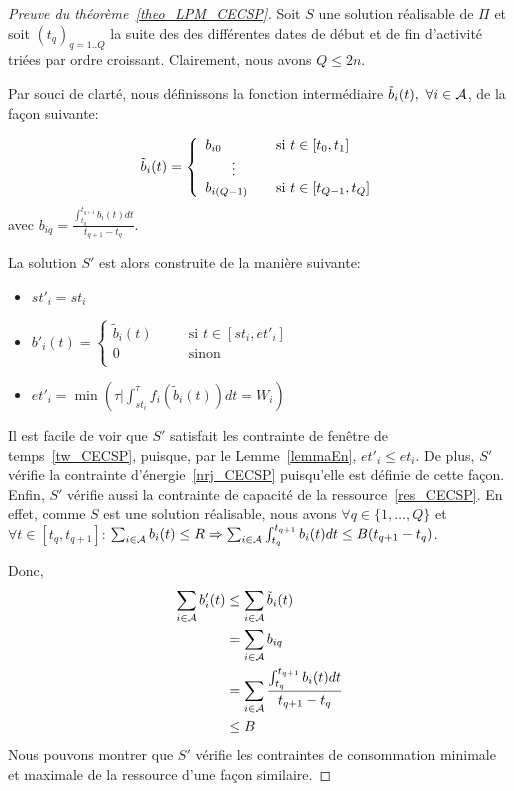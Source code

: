 \begin{proof}[Preuve du théorème~\ref{theo_LPM_CECSP}]  
  Soit $S$ une solution réalisable de $\Pi$ et soit
  $(t_q)_{q=1..Q}$ la suite des des différentes dates de
  début et de fin d'activité triées par ordre croissant. Clairement,
  nous avons $Q\le 2n$. 

  Par souci de clarté, nous définissons la fonction intermédiaire
  $\tilde{b}_i(t),\ \forall i \in {\cal A}$, de la façon suivante:  

    \[\tilde{b}_i(t) =\left\{
        \begin{array}{lll}
          b_{i0} & & \text{si $t \in [t_0,t_1]$}\\
          \multicolumn{2}{c}{\vdots} &   \\
          b_{i(Q-1)} & & \text{si $t \in [t_{Q-1},t_Q]$}
        \end{array}
      \right.\]
    avec $b_{iq}=\frac{\int_{t_q}^{t_{q+1}} b_i(t) dt}{t_{q+1}-t_q}$.

    La solution $S'$ est alors construite de la manière suivante: 
    \begin{itemize}
    \item $st'_i=st_i$ 
    \item $b'_i(t)= \left\{ 
        \begin{array}{lll}
          \tilde{b}_i(t) &\quad& \text{si $t \in [st_i,et'_i]$}\\
          0 &\quad& \text{sinon}\\
        \end{array}
      \right.$
  \item $et'_i=\min(\tau | \int_{st_i}^{\tau} f_i(\tilde{b}_i(t))dt=W_i)$
  \end{itemize}

  Il est facile de voir que $S'$ satisfait les contrainte de fenêtre de
  temps~\eqref{tw_CECSP}, puisque, par le Lemme~\ref{lemmaEn},
  $et'_i\le et_i$. De plus, $S'$ vérifie la contrainte 
  d'énergie~\eqref{nrj_CECSP} puisqu'elle est définie de cette
  façon. Enfin, $S'$ vérifie aussi la contrainte de capacité de la
  ressource~\eqref{res_CECSP}. En effet, comme $S$ est une solution
  réalisable, nous avons $\forall q \in \{1,\dots,Q\}$ et $\forall t
  \in [t_q,t_{q+1}]$:  
  $\sum_{i\in {\cal A}}b_i(t) \le R \Rightarrow  
  \sum_{i\in {\cal A}} \int_{t_q}^{t_{q+1}} b_i(t)dt \le B(t_{q+1}-t_q)$.
 
  Donc, 
  \begin{align*}
    \sum_{i\in {\cal A}}b'_i(t) &\le 
                            \sum_{i\in {\cal A}} \tilde{b}_i(t)\\
                          &= 
                            \sum_{i\in {\cal A}} b_{iq}\\
                          &=
                            \sum_{i\in {\cal A}} \frac{\int_{t_q}^{t_{q+1}} b_i(t)dt}{t_{q+1}-t_q} \\
                          &\le B
  \end{align*}
  Nous pouvons montrer que $S'$ vérifie les contraintes de
  consommation minimale et maximale de la ressource d'une façon
  similaire. 
\end{proof}

